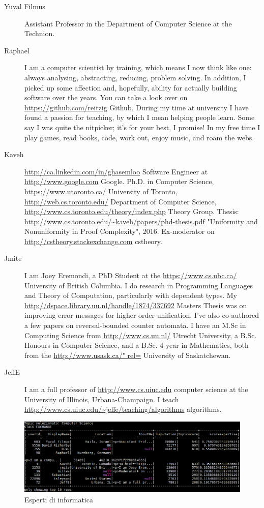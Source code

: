\begin{description}
	\item[Yuval Filmus]Assistant Professor in the Department of Computer Science at the Technion.
	\item[Raphael]I am a computer scientist by training, which means I now think like one: always analysing,  abstracting, reducing, problem solving. In addition, I picked up some affection and, hopefully, ability for actually building software over the years. You can take a look over on \url{https://github.com/reitzig} Github. During my time at university I have found a passion for teaching, by which I mean helping people learn. Some say I was quite the nitpicker; it's for your best, I promise! In my free time I play games, read books, code, work out, enjoy music, and roam the webs.
	\item[Kaveh]\url{http://ca.linkedin.com/in/ghasemloo} Software Engineer at \url{http://www.google.com} Google. Ph.D. in Computer Science, \url{https://www.utoronto.ca/} University of Toronto, \url{http://web.cs.toronto.edu/} Department of Computer Science, \url{http://www.cs.toronto.edu/theory/index.php} Theory Group. Thesis: \url{http://www.cs.toronto.edu/~kaveh/papers/phd-thesis.pdf} "Uniformity and Nonuniformity in Proof Complexity", 2016. Ex-moderator on \url{http://cstheory.stackexchange.com} cstheory.
	\item[Jmite]I am Joey Eremondi, a PhD Student at the \url{https://www.cs.ubc.ca/} University of British Columbia. I do research in Programming Languages and Theory of Computation, particularly with dependent types. My \url{http://dspace.library.uu.nl/handle/1874/337692} Masters Thesis was on improving error messages for higher order unification. I've also co-authored a few papers on reversal-bounded counter automata. I have an M.Sc in Computing Science from \url{http://www.cs.uu.nl/} Utrecht University, a B.Sc. Honours in Computer Science, and a B.Sc. 4-year in Mathematics, both from the \url{http://www.usask.ca/" rel=} University of Saskatchewan.
	\item[JeffE]I am a full professor of \url{http://www.cs.uiuc.edu} computer science at the University of Illinois, Urbana-Champaign.  I teach \url{http://www.cs.uiuc.edu/~jeffe/teaching/algorithms} algorithms.
	
\end{description}

\begin{figure}[H]
	\centering
	\includegraphics[scale=0.7]{image/cs.PNG}
	\caption{Esperti di informatica}
	\label{fig:cs}
\end{figure}

